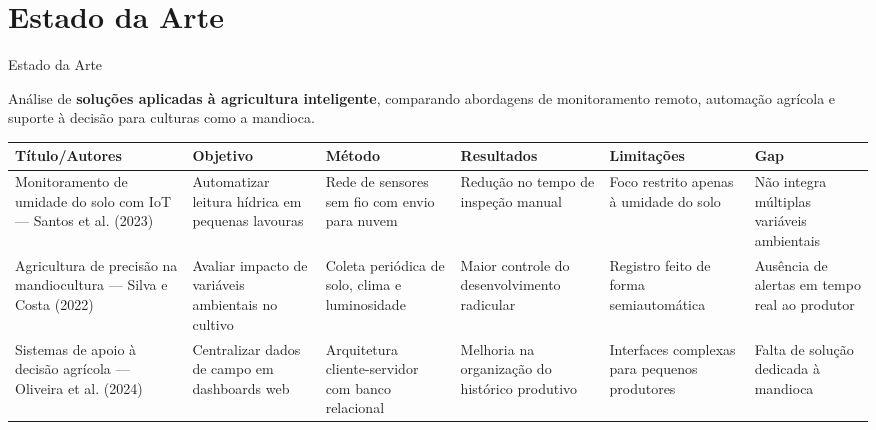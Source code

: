 \documentclass[aspectratio=169]{beamer}
\begin{document}
\section{Estado da Arte}
\begin{frame}[t]{Estado da Arte}
  \scriptsize
  
  Análise de \textbf{soluções aplicadas à agricultura inteligente}, comparando abordagens de monitoramento remoto, automação agrícola e suporte à decisão para culturas como a mandioca.
  
  \vspace{0.3cm}
  
  \begin{table}
    \centering
    \tiny
    \begin{tabular}{|p{2.4cm}|p{2.0cm}|p{2.1cm}|p{2.0cm}|p{2.0cm}|p{1.6cm}|}
      \hline
      \textbf{Título/Autores} & \textbf{Objetivo} & \textbf{Método} & \textbf{Resultados} & \textbf{Limitações} & \textbf{Gap} \\
      \hline
      Monitoramento de umidade do solo com IoT — Santos et al. (2023) & Automatizar leitura hídrica em pequenas lavouras & Rede de sensores sem fio com envio para nuvem & Redução no tempo de inspeção manual & Foco restrito apenas à umidade do solo & Não integra múltiplas variáveis ambientais \\
      \hline
      Agricultura de precisão na mandiocultura — Silva e Costa (2022) & Avaliar impacto de variáveis ambientais no cultivo & Coleta periódica de solo, clima e luminosidade & Maior controle do desenvolvimento radicular & Registro feito de forma semiautomática & Ausência de alertas em tempo real ao produtor \\
      \hline
      Sistemas de apoio à decisão agrícola — Oliveira et al. (2024) & Centralizar dados de campo em dashboards web & Arquitetura cliente-servidor com banco relacional & Melhoria na organização do histórico produtivo & Interfaces complexas para pequenos produtores & Falta de solução dedicada à mandioca \\
      \hline
    \end{tabular}
  \end{table}
\end{frame}
\end{document}
